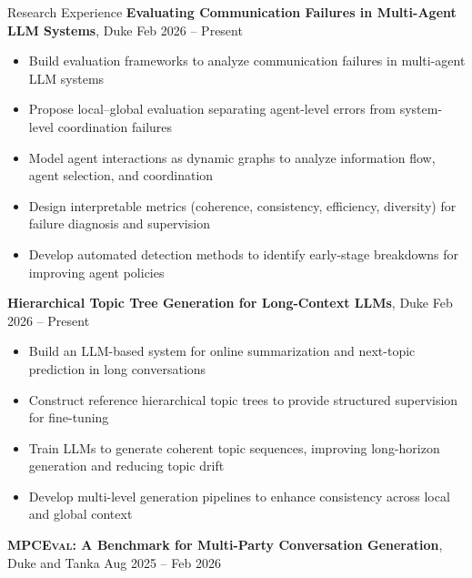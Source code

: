\documentclass[hidelinks]{resume} %
\begin{document}
\begin{rSection}{R\MakeLowercase{esearch} E\MakeLowercase{xperience}}
\textbf{Evaluating Communication Failures in Multi-Agent LLM Systems}, Duke
\hfill Feb 2026 -- Present
\vspace{-5pt}
\begin{itemize}
\itemsep -7pt {}
\item Build evaluation frameworks to analyze communication failures in multi-agent LLM systems
\item Propose local--global evaluation separating agent-level errors from system-level coordination failures
\item Model agent interactions as dynamic graphs to analyze information flow, agent selection, and coordination
\item Design interpretable metrics (coherence, consistency, efficiency, diversity) for failure diagnosis and supervision
\item Develop automated detection methods to identify early-stage breakdowns for improving agent policies
\end{itemize}

\textbf{Hierarchical Topic Tree Generation for Long-Context LLMs}, Duke
\hfill Feb 2026 -- Present
\vspace{-5pt}
\begin{itemize}
\itemsep -7pt {}
\item Build an LLM-based system for online summarization and next-topic prediction in long conversations
\item Construct reference hierarchical topic trees to provide structured supervision for fine-tuning
\item Train LLMs to generate coherent topic sequences, improving long-horizon generation and reducing topic drift
\item Develop multi-level generation pipelines to enhance consistency across local and global context
\end{itemize}

\textbf{\textsc{MPCEval}: A Benchmark for Multi-Party Conversation Generation}, Duke and Tanka
\hfill Aug 2025 -- Feb 2026
\vspace{-5pt}
\begin{itemize}
\itemsep -7pt {} 


\end{itemize}
\end{rSection}
\end{document}
